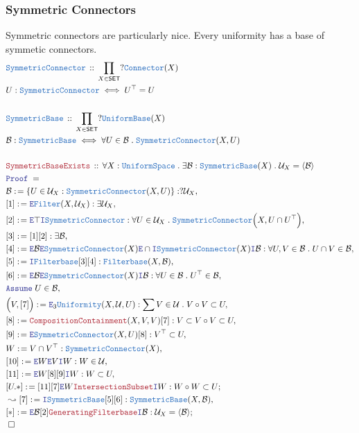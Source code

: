 \documentclass[12pt]{scrartcl}
\newcommand{\TYPE}[1]{\textcolor{NavyBlue}{\mathtt{#1}}}
\newcommand{\LOGIC}[1]{\textcolor{Blue}{\mathtt{#1}}}
\newcommand{\THM}[1]{\textcolor{Maroon}{\mathtt{#1}}}
\renewcommand{\.}{\; . \;}
\newcommand{\de}{: \kern 0.1pc =}
\newcommand{\Theorem}[2]{& \THM{#1} \, :: \, #2 \\ & \Proof = \\ }
\newcommand{\DeclareType}[2]{& \TYPE{#1} \, :: \, #2 \\}
\newcommand{\DefineType}[3]{& #1 : \TYPE{#2} \iff #3 \\}
\newcommand{\Page}[1]{ \begin{align*} #1 \end{align*}   }
\newcommand{\Say}[3]{& #1 \de #2 : #3, \\}
\newcommand{\Conclude}[3]{& #1 \de #2 : #3; \\}
\newcommand{\Derive}[3]{& \leadsto #1 \de #2 : #3, \\}
\newcommand{\AssumeIn}[2]{& \LOGIC{Assume} \; #1 \in #2, \\}
\newcommand{\Intro}{\LOGIC{I}}
\newcommand{\Elim}{\LOGIC{E}}
\newcommand{\QED}{\; \square}
\newcommand{\EndProof}{& \QED \\}
\newcommand{\Proof}{\LOGIC{Proof} \; }
\newcommand{\B}{\mathcal{B}}
\newcommand{\SET}{\mathsf{SET}}
\newcommand{\Filterbase}{\TYPE{Filterbase}}
\renewcommand{\U}{\mathcal{U}}
\newcommand{\Connector}{\TYPE{Connector}}
\newcommand{\Unif}{\TYPE{Uniformity}}
\newcommand{\US}{\TYPE{UniformSpace}}
\newcommand{\UB}{\TYPE{UniformBase}}
\newcommand{\Sym}{\TYPE{SymmetricConnector}}
\newcommand{\SB}{\TYPE{SymmetricBase}}
\begin{document}
\subsubsection{Symmetric Connectors}
Symmetric connectors are particularly nice.
Every uniformity has a base of symmetic connectors.
\Page{
	\DeclareType{\Sym}{\prod_{X \in \SET} ?\Connector(X)}
	\DefineType{U}{\Sym}{U^\top = U}
	\\
	\DeclareType{\SB}{\prod_{X \in \SET} ?\UB(X)}
	\DefineType{\B}{\SB}{\forall U \in \B \. \Sym(X,U)}	
	\\
	\Theorem{SymmetricBaseExists}
	{
		\forall X : \US \.
		\exists \B : \SB(X) \.
		\U_X = \langle \B \rangle
	}
	\Say{\B}
	{
		\{
			U \in \U_X : \Sym(X,U)
		\}
	}
	{
		?\U_X
	}
	\Say{[1]}{\Elim \TYPE{Filter}(X,\U_X)}
	{
		\exists \U_X
	}
	\Say{[2]}{\Elim \top \Intro \Sym}
	{
		\forall U \in \U_X \. \Sym\Big(X,U \cap U^\top\Big)
	}
	\Say{[3]}{[1][2]}{\exists \B}
	\Say{[4]}{\Elim \B\Elim \Sym(X) \Elim \cap \Intro \Sym(X) \Intro \B }
	{
		\forall U,V \in \B \. U \cap V \in \B
	}
	\Say{[5]}{\Intro \Filterbase[3][4]}
	{
		\Filterbase(X,\B)
	}
	\Say{[6]}{\Elim \B \Elim \Sym(X) \Intro \B }
	{
		\forall U \in \B \.  U^\top \in \B
	}
	\AssumeIn{U}{\B}
	\Say{\Big(V,[7]\Big)}
	{
		\Elim_3 \Unif(X,\U,U)
	}
	{
		\sum V \in \U \. V \circ V \subset U
	}
	\Say{[8]}{\THM{CompositionContainment}(X,V,V)[7]}
	{
		V \subset V \circ V \subset U
	}
	\Say{[9]}{\Elim \Sym(X,U)[8]}
	{
		V^\top \subset U
	}
	\Say{W}{V \cap V^\top}{\Sym(X)}
	\Say{[10]}{\Elim W \Elim V \Intro W}{W \in \U}
	\Say{[11]}{\Elim W [8][9] \Intro W}{ W \subset U}
	\Conclude{[U.*]}{[11][7] \Elim W \THM{IntersectionSubset} \Intro W}
	{
		W \circ W  \subset U
	}
	\Derive{[7]}
	{
		\Intro \SB [5][6]
	}
	{
		\SB(X,\B)
	}
	\Conclude{[*]}{\Elim \B [2] \THM{GeneratingFilterbase} \Intro \B}
	{
		\U_X = \langle \B \rangle
	}
	\EndProof
}
\newpage
\end{document}
